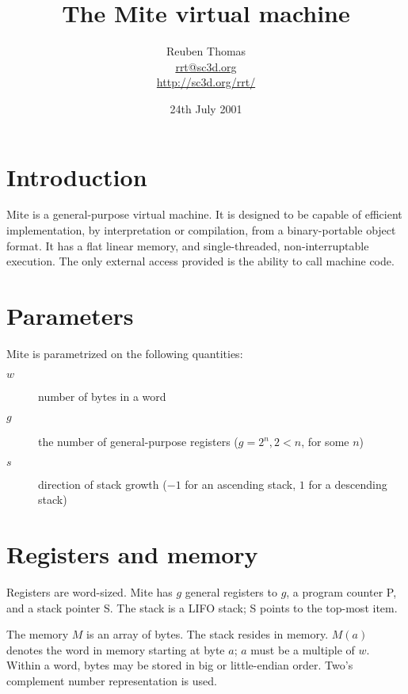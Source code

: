 \documentclass[english]{scrartcl}
\newcommand{\synfont}{\sffamily}
\newcommand{\syn}[1]{{\synfont #1}}
\begin{document}
\title{The Mite virtual machine}
\author{Reuben Thomas\\\url{rrt@sc3d.org}\\\url{http://sc3d.org/rrt/}}
\date{24th July 2001}
\maketitle



\section{Introduction}

Mite is a general-purpose virtual machine. It is designed to be capable of
efficient implementation, by interpretation or compilation, from a
binary-portable object format. It has a flat linear memory, and
single-threaded, non-interruptable execution. The only external access
provided is the ability to call machine code.



\section{Parameters}

Mite is parametrized on the following quantities:

\begin{description}
\item[$w$]number of bytes in a word

\item[$g$]the number of general-purpose registers ($g=2^n, 2<n$, for
some $n$)

\item[$s$]direction of stack growth ($-1$ for an ascending stack, $1$
for a descending stack)
\end{description}



\section{Registers and memory}

Registers are word-sized. Mite has $g$ general registers \syn{1} to $g$, a
program counter \syn{P}, and a stack pointer \syn{S}. The stack is a LIFO
stack; \syn{S} points to the top-most item.

The memory $M$ is an array of bytes. The stack resides in memory. $M(a)$
denotes the word in memory starting at byte $a$; $a$ must be a multiple of
$w$. Within a word, bytes may be stored in big or little-endian order. Two's
complement number representation is used.
\end{document}
